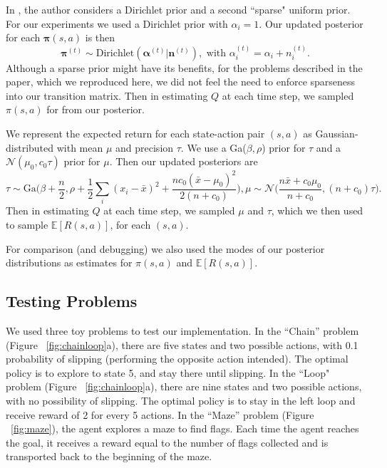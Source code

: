 \documentclass[10pt, twoside]{article}
\begin{document}
In \cite{strens}, the author considers a Dirichlet prior and a second ``sparse"
uniform prior. For our experiments we used a Dirichlet prior with $\alpha_i = 1$.
Our updated posterior for each $\mathbf{\pi}(s, a)$ is then
\begin{equation}
\mathbf{\pi}^{(t)} \sim \textrm{Dirichlet}(\mathbf{\alpha}^{(t)}| \mathbf{n}^{(t)}),
\textrm{ with } \alpha^{(t)}_i = \alpha_i + n_i^{(t)}.
\end{equation}
Although a sparse prior might have its benefits, for the problems described in the paper,
which we reproduced here, we did not feel the need to enforce sparseness into our
transition matrix. Then in estimating $Q$ at each time step, we sampled $\pi(s, a)$ for
from our posterior.

We represent the expected return for each state-action pair $(s, a)$ as Gaussian-
distributed with mean $\mu$ and precision $\tau$. We use a Ga($\beta,\rho$)
prior for $\tau$ and a $\mathcal{N}(\mu_0, c_0\tau)$ prior for $\mu$. Then our
updated posteriors are
\begin{equation}
\tau \sim \textrm{Ga}\Big(\beta + \frac{n}{2}, \rho + \frac{1}{2}\sum_i(x_i - \bar{x})^2
+ \frac{nc_0(\bar{x}-\mu_0)^2}{2(n+c_0)}\Big),
\mu \sim \mathcal{N}\Big(\frac{n\bar{x} + c_0\mu_0}{n + c_0}, (n+c_0)\tau\Big).
\end{equation}
Then in estimating $Q$ at each time step, we sampled $\mu$ and $\tau$, which we then used
to sample $\mathbb{E}[R(s, a)]$, for each $(s, a)$.

For comparison (and debugging) we also used the modes of our posterior distributions as
estimates for $\pi(s, a)$ and $\mathbb{E}[R(s,a)]$.

\subsection{Testing Problems}
We used three toy problems to test our implementation. In the ``Chain'' problem
(Figure ~\ref{fig:chainloop}a), there are five states and two possible actions, with 0.1
probability of slipping (performing the opposite action intended). The optimal
policy is to explore to state 5, and stay there until slipping. In the ``Loop" problem
(Figure ~\ref{fig:chainloop}a), there are nine states and two possible actions, with no
possibility of slipping. The optimal policy is to stay in the left loop and receive
reward of 2 for every 5 actions. In the ``Maze'' problem (Figure ~\ref{fig:maze}),
the agent explores a maze to find flags. Each time the agent reaches the goal, it
receives a reward equal to the number of flags collected and is transported back to
the beginning of the maze.
\end{document}

